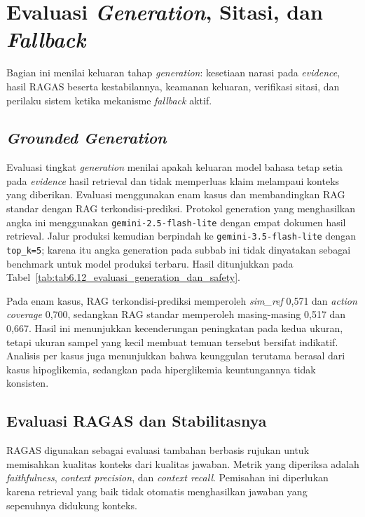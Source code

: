 \section{Evaluasi \textit{Generation}, Sitasi, dan \textit{Fallback}}
\label{sec:bab6-evaluasi-generation-citation-fallback}

Bagian ini menilai keluaran tahap \textit{generation}: kesetiaan narasi pada \textit{evidence}, hasil RAGAS beserta kestabilannya, keamanan keluaran,
verifikasi sitasi, dan perilaku sistem ketika mekanisme \textit{fallback} aktif.

\subsection{\textit{Grounded Generation}}
\label{subsec:bab6-evaluasi-grounded-generation}

Evaluasi tingkat \textit{generation} menilai apakah keluaran model bahasa tetap setia pada \textit{evidence} hasil retrieval dan tidak memperluas klaim
melampaui konteks yang diberikan. Evaluasi menggunakan enam kasus dan membandingkan RAG standar dengan
RAG terkondisi-prediksi. Protokol generation yang menghasilkan angka ini menggunakan \texttt{gemini-2.5-flash-lite} dengan empat dokumen hasil retrieval.
Jalur produksi kemudian berpindah ke \texttt{gemini-3.5-flash-lite} dengan \texttt{top\_k=5}; karena itu angka generation pada subbab ini tidak dinyatakan
sebagai benchmark untuk model produksi terbaru. Hasil ditunjukkan pada Tabel~\ref{tab:tab6.12_evaluasi_generation_dan_safety}.



Pada enam kasus, RAG terkondisi-prediksi memperoleh \textit{sim\_ref} 0,571 dan \textit{action coverage} 0,700, sedangkan RAG standar memperoleh
masing-masing 0,517 dan 0,667. Hasil ini menunjukkan kecenderungan peningkatan pada kedua ukuran, tetapi ukuran sampel yang kecil membuat temuan
tersebut bersifat indikatif. Analisis per kasus juga menunjukkan bahwa keunggulan terutama berasal dari kasus hipoglikemia, sedangkan pada hiperglikemia
keuntungannya tidak konsisten.

\subsection{Evaluasi RAGAS dan Stabilitasnya}
\label{subsec:bab6-evaluasi-ragas}

RAGAS digunakan sebagai evaluasi tambahan berbasis rujukan untuk memisahkan kualitas konteks dari kualitas jawaban. Metrik yang diperiksa adalah
\textit{faithfulness}, \textit{context precision}, dan \textit{context recall}. Pemisahan ini diperlukan karena retrieval yang baik tidak otomatis
menghasilkan jawaban yang sepenuhnya didukung konteks.

